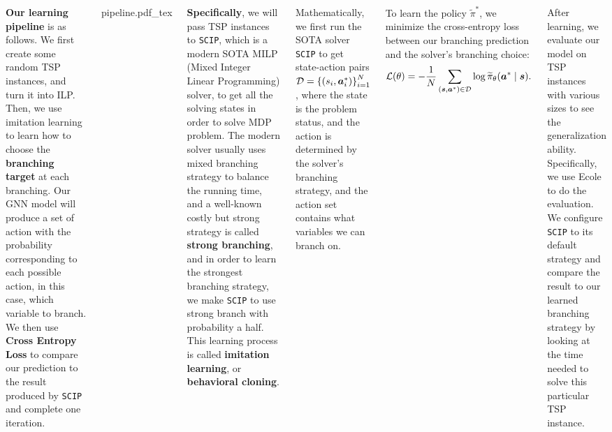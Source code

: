 \documentclass[20pt,,margin=1in,innermargin=-4.5in,blockverticalspace=-0.25in]{tikzposter}
\newcommand{\incfig}[1]{%
	\def\svgwidth{0.35\columnwidth}
	{#1.pdf_tex}
}
\begin{document}
\begin{columns}
{	\vspace{1em}
	\textbf{Our learning pipeline} is as follows. We first create some random TSP instances, and turn it into ILP.
	Then, we use imitation learning to learn how to choose the \textbf{branching target} at each branching.
	Our GNN model will produce a set of action with the probability corresponding to each possible action, in this
	case, which variable to branch. We then use \textbf{Cross Entropy Loss} to compare our prediction to the result
	produced by \texttt{SCIP} and complete one iteration.
	\begin{tikzfigure}
		\centering
		\incfig{pipeline}
	\end{tikzfigure}
	\textbf{Specifically}, we will pass TSP instances to \texttt{SCIP}, which is a modern SOTA MILP (Mixed Integer Linear Programming) solver, to get all
	the solving states in order to solve MDP problem. The modern solver usually uses mixed branching strategy to balance the running
	time, and a well-known costly but strong strategy is called \textbf{strong branching}, and in order to learn the strongest branching strategy, we make
	\texttt{SCIP} to use strong branch with probability a half. This learning process is called \textbf{imitation learning}, or \textbf{behavioral
		cloning}.

	Mathematically, we first run the SOTA solver \texttt{SCIP} to get state-action pairs \(\mathcal{\MakeUppercase{d}} = \left\{(s_{i} , \bm{a} _{i} ^\ast)\right\}_{i = 1}^N\),
	where the state is the problem status, and the action is determined by the solver's branching strategy, and the action set contains what variables we can branch on.


	To learn the policy \(\widetilde{\pi} ^\ast\), we minimize the cross-entropy loss between our branching prediction and the solver's branching choice:
	\[
		\mathcal{\MakeUppercase{l}} (\theta ) = - \frac{1}{N}\sum\limits_{(\bm{s}, \bm{a}^\ast)\in \mathcal{\MakeUppercase{d}} }\log \widetilde{\pi}_\theta (\bm{a} ^\ast \mid \bm{s} ).
	\]

	After learning, we evaluate our model on TSP instances with various sizes to see the generalization ability. Specifically, we use
	Ecole to do the evaluation. We configure \texttt{SCIP} to its default strategy and compare the result to our learned branching
	strategy by looking at the time needed to solve this particular TSP instance.
	}


\end{columns}
\end{document}
